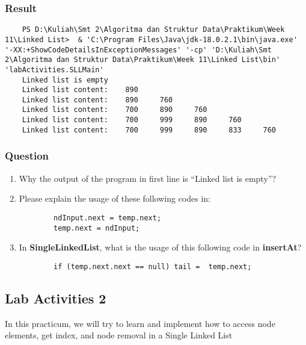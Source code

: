 \documentclass[12pt,titlepage]{article}
\begin{document}
\subsubsection{Result}

\begin{verbatim}
    PS D:\Kuliah\Smt 2\Algoritma dan Struktur Data\Praktikum\Week 11\Linked List>  & 'C:\Program Files\Java\jdk-18.0.2.1\bin\java.exe' '-XX:+ShowCodeDetailsInExceptionMessages' '-cp' 'D:\Kuliah\Smt 2\Algoritma dan Struktur Data\Praktikum\Week 11\Linked List\bin' 'labActivities.SLLMain'
    Linked list is empty
    Linked list content:    890
    Linked list content:    890     760
    Linked list content:    700     890     760
    Linked list content:    700     999     890     760
    Linked list content:    700     999     890     833     760
\end{verbatim}

\subsubsection{Question}

\begin{enumerate}
    \item Why the output of the program in first line is “Linked list is empty”?
    \item Please explain the usage of these following codes in:
    \begin{verbatim}
        ndInput.next = temp.next;
        temp.next = ndInput;
    \end{verbatim}
    \item In \textbf{SingleLinkedList}, what is the usage of this following code in \textbf{insertAt}?
    \begin{verbatim}
        if (temp.next.next == null) tail =  temp.next;
    \end{verbatim} 
\end{enumerate}

\subsection{Lab Activities 2}
In this practicum, we will try to learn and implement how to access node elements, get index, and node removal in a Single Linked List
\end{document}
